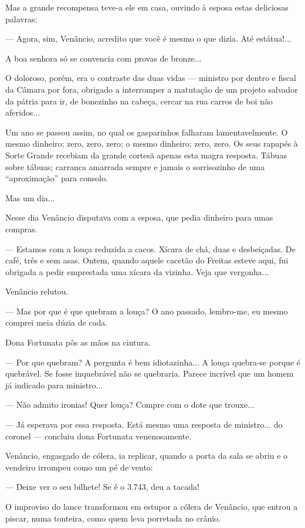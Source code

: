 Mas a grande recompensa teve-a ele em casa, ouvindo à esposa estas
deliciosas palavras:

--- Agora, sim, Venâncio, acredito que você é mesmo o que dizia. Até
estátua!...

A boa senhora só se convencia com provas de bronze...

O doloroso, porém, era o contraste das duas vidas --- ministro por
dentro e fiscal da Câmara por fora, obrigado a interromper a matutação
de um projeto salvador da pátria para ir, de bonezinho na cabeça, cercar
na rua carros de boi não aferidos...

Um ano se passou assim, no qual os gasparinhos falharam lamentavelmente.
O mesmo dinheiro; zero, zero, zero; o mesmo dinheiro; zero, zero. Os
seus rapapés à Sorte Grande recebiam da grande cortesã apenas esta magra
resposta. Tábuas sobre tábuas; carranca amarrada sempre e jamais o
sorrisozinho de uma ``aproximação'' para consolo.

Mas um dia...

Nesse dia Venâncio disputava com a esposa, que pedia dinheiro para umas
compras.

--- Estamos com a louça reduzida a cacos. Xícara de chá, duas e
desbeiçadas. De café, três e sem asas. Ontem, quando aquele cacetão do
Freitas esteve aqui, fui obrigada a pedir emprestada uma xícara da
vizinha. Veja que vergonha...

Venâncio relutou.

--- Mas por que é que quebram a louça? O ano passado, lembro-me, eu
mesmo comprei meia dúzia de cada.

Dona Fortunata pôs as mãos na cintura.

--- Por que quebram? A pergunta é bem idiotazinha... A louça quebra-se
porque é quebrável. Se fosse inquebrável não se quebraria. Parece
incrível que um homem já indicado para ministro...

--- Não admito ironias! Quer louça? Compre com o dote que trouxe...

--- Já esperava por essa resposta. Está mesmo uma resposta de
ministro... do coronel --- concluiu dona Fortunata venenosamente.

Venâncio, engasgado de cólera, ia replicar, quando a porta da sala se
abriu e o vendeiro irrompeu como um pé de vento:

--- Deixe ver o seu bilhete! Se é o 3.743, deu a tacada!

O improviso do lance transformou em estupor a cólera de Venâncio, que
entrou a piscar, numa tonteira, como quem leva porretada no crânio.

